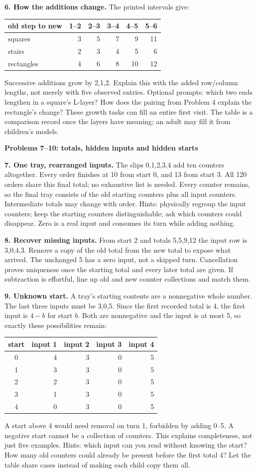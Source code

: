 \documentclass[11pt]{article}
\newcommand{\heading}[1]{\par\textbf{#1}\par}
\begin{document}
\textbf{6. How the additions change.} The printed intervals give:
\begin{center}\begin{tabular}{lrrrrr}\toprule
old step to new&1--2&2--3&3--4&4--5&5--6\\\midrule
squares&3&5&7&9&11\\
stairs&2&3&4&5&6\\
rectangles&4&6&8&10&12\\\bottomrule
\end{tabular}\end{center}
Successive additions grow by 2,1,2. Explain this with the added row/column lengths, not merely with five observed entries. Optional prompts: which two ends lengthen in a square's L-layer? How does the pairing from Problem 4 explain the rectangle's change? These growth tasks can fill an entire first visit. The table is a comparison record once the layers have meaning; an adult may fill it from children's models.
\newpage
\heading{Problems 7--10: totals, hidden inputs and hidden starts}
\textbf{7. One tray, rearranged inputs.} The slips 0,1,2,3,4 add ten counters altogether. Every order finishes at 10 from start 0, and 13 from start 3. All 120 orders share this final total; no exhaustive list is needed. Every counter remains, so the final tray consists of the old starting counters plus all input counters. Intermediate totals may change with order. Hints: physically regroup the input counters; keep the starting counters distinguishable; ask which counters could disappear. Zero is a real input and consumes its turn while adding nothing.

\textbf{8. Recover missing inputs.} From start 2 and totals 5,5,9,12 the input row is 3,0,4,3. Remove a copy of the old total from the new total to expose what arrived. The unchanged 5 has a zero input, not a skipped turn. Cancellation proves uniqueness once the starting total and every later total are given. If subtraction is effortful, line up old and new counter collections and match them.

\textbf{9. Unknown start.} A tray's starting contents are a nonnegative whole number. The last three inputs must be 3,0,5. Since the first recorded total is 4, the first input is $4-b$ for start $b$. Both are nonnegative and the input is at most 5, so exactly these possibilities remain:
\begin{center}\begin{tabular}{c|rrrr}
start&input 1&input 2&input 3&input 4\\\hline
0&4&3&0&5\\
1&3&3&0&5\\
2&2&3&0&5\\
3&1&3&0&5\\
4&0&3&0&5
\end{tabular}\end{center}
A start above 4 would need removal on turn 1, forbidden by adding 0--5. A negative start cannot be a collection of counters. This explains completeness, not just five examples. Hints: which input can you read without knowing the start? How many old counters could already be present before the first total 4? Let the table share cases instead of making each child copy them all.
\end{document}

